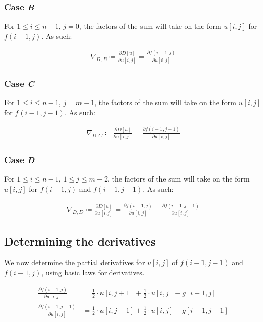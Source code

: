 \documentclass[a4paper]{scrreprt}
\begin{document}
\subsubsection{Case \emph{B}}

For $1 \leq i \leq n-1$, $j = 0$, the factors of the sum will take on the form
$u[i, j]$ for $f(i - 1, j)$. As such:

\begin{align*}
		\nabla_{D, B} \coloneqq \frac{\partial D[u]}{\partial u[i, j]} = \frac{\partial f(i - 1, j)}{\partial u[i, j]}
\end{align*}


\subsubsection{Case \emph{C}}

For $1 \leq i \leq n-1$, $j = m - 1$, the factors of the sum will take on the form
$u[i, j]$ for $f(i - 1, j - 1)$. As such:

\begin{align*}
		\nabla_{D, C} \coloneqq \frac{\partial D[u]}{\partial u[i, j]} = \frac{\partial f(i - 1, j - 1)}{\partial u[i, j]}
\end{align*}


\subsubsection{Case \emph{D}}

For $1 \leq i \leq n-1$, $1 \leq j \leq m - 2$, the factors of the sum will
take on the form $u[i, j]$ for $f(i - 1, j)$ and $f(i - 1, j - 1)$. As such:

\begin{align*}
		\nabla_{D, D} \coloneqq \frac{\partial D[u]}{\partial u[i, j]} = \frac{\partial f(i - 1, j)}{\partial u[i, j]} + \frac{\partial f(i - 1, j - 1)}{\partial u[i, j]}
\end{align*}

\subsection{Determining the derivatives}

We now determine the partial derivatives for $u[i, j]$ of $f(i - 1, j - 1)$ and
$f(i - 1, j)$, using basic laws for derivatives.

\begin{align*}
		\frac{\partial f(i - 1, j)}{\partial u[i, j]} & =
		\frac{1}{2} \cdot u[i, j + 1] + \frac{1}{2} \cdot u[i, j] - g[i - 1, j] \\
		\frac{\partial f(i - 1, j - 1)}{\partial u[i, j]} & =
		\frac{1}{2} \cdot u[i, j - 1] + \frac{1}{2} \cdot u[i, j] - g[i - 1, j - 1]
\end{align*}
\end{document}
